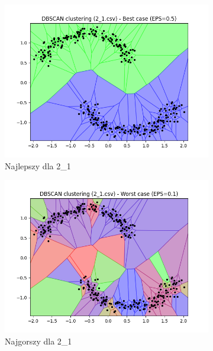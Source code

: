 \documentclass[12pt]{article}
\begin{document}
\begin{figure}[H]
\begin{subfigure}[b]{0.24\textwidth}
        \includegraphics[width=\linewidth]{img/exp_1/dbscan/2_1_best.png}
        \caption{Najlepszy dla 2\_1}
    \end{subfigure}
    \hfill
    \begin{subfigure}[b]{0.24\textwidth}
        \includegraphics[width=\linewidth]{img/exp_1/dbscan/2_1_worst.png}
        \caption{Najgorszy dla 2\_1}
    \end{subfigure}
    \begin{subfigure}[b]{0.24\textwidth}

\end{subfigure}
\end{figure}
\end{document}
